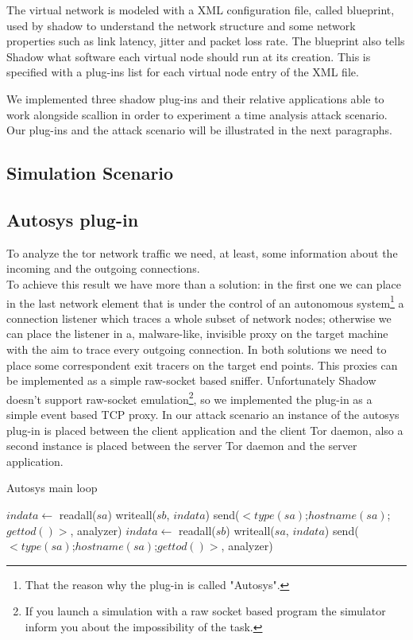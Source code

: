 The virtual network is modeled with a XML configuration
file, called blueprint, used by shadow to understand the network
structure and some network properties such as link latency, jitter and
packet loss rate. The blueprint also tells Shadow what software each
virtual node should run at its creation. This is specified with a
plug-ins list for each virtual node entry of the XML file.

We implemented three shadow plug-ins and their relative applications 
 able to work alongside scallion in
order to experiment a time analysis attack scenario. Our plug-ins and
the attack scenario will be illustrated in the next paragraphs.

\subsection{Simulation Scenario}

\subsection{Autosys plug-in}
To analyze the tor network traffic we need, at least, some information about
the incoming and the outgoing connections.\\
To achieve this result we have more than a solution: in the first one we can place 
in the last network element that is under the control of an autonomous system\footnote{
That the reason why the plug-in is called "Autosys".} a connection
listener which traces a whole subset of
network nodes;
otherwise we can place the listener in a, malware-like, invisible proxy on the target
machine with the aim to trace every outgoing connection. 
In both solutions we need to place some correspondent exit tracers on
the target end points.
This proxies can be implemented as a simple raw-socket based sniffer. 
Unfortunately Shadow doesn't support raw-socket
emulation\footnote{If you launch a simulation with a raw socket based program the simulator
inform you about the impossibility of the task.},
so we implemented the plug-in as a simple event based TCP
proxy. In our attack scenario an instance of the autosys plug-in is placed 
between the client application and the client Tor daemon, also a second
 instance is placed between the server Tor daemon and the server application.
\\
\begin{algorithm}
\caption{Autosys main loop}
\begin{algorithmic}[1]
			\State $indata \gets $ readall($sa$)
			\State writeall($sb$, $indata$)
				\State send($<type(sa)$;$hostname(sa)$;$gettod()>$, analyzer)
			\EndIf
		\EndIf
			\State $indata \gets $ readall($sb$)
			\State writeall($sa$, $indata$)
				\State send($<type(sa)$;$hostname(sa)$;$gettod()>$, analyzer)
			\EndIf
		\EndIf
	\EndWhile
\EndFunction
\end{algorithmic}
\label{alg:auto_main}
\end{algorithm}

